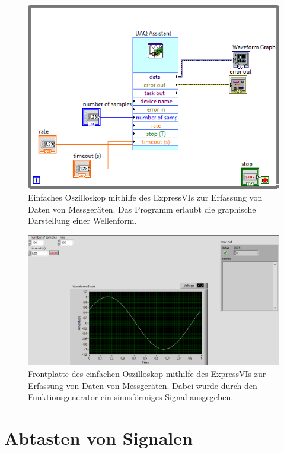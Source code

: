 \documentclass[
a4paper,
12pt,
pagesize,
ngerman
]{scrartcl}
\begin{document}
	\begin{figure}[H]  
		\includegraphics[width=1\textwidth]{EIRE2018Dateien/Tag2/expressVI_1d}
		\centering
		\caption{
			Einfaches Oszilloskop mithilfe des ExpressVIs zur Erfassung von Daten von Messgeräten. Das Programm erlaubt die graphische Darstellung einer Wellenform.
		}
		\label{fig_tag2_oszi_express_block}
		\centering
	\end{figure}
	\begin{figure}[H]  
		\includegraphics[width=1\textwidth]{EIRE2018Dateien/Tag2/expressVI_1p}
		\centering
		\caption{
			Frontplatte des einfachen Oszilloskop mithilfe des ExpressVIs zur Erfassung von Daten von Messgeräten. Dabei wurde durch den Funktionsgenerator ein sinusförmiges Signal ausgegeben.
		}
		\label{fig_tag2_oszi_express_front}
	\centering
	\end{figure}
	
	\newpage
	
	
	\section{Abtasten von Signalen}
	
\end{document}
